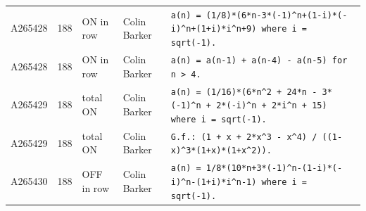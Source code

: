 \documentclass[11pt]{article}
\theoremstyle{definition}
\theoremstyle{remark}
\begin{document}
{\begin{longtable}{p{1.3cm}p{0.7cm}p{2.4cm}p{2.3cm}p{7.3cm}}
A265428 & 188 & ON in row & Colin Barker & \texttt{a(n)\allowbreak{} \allowbreak{}=\allowbreak{} \allowbreak{}(1/\allowbreak{}8)\allowbreak{}*\allowbreak{}(6*\allowbreak{}n-\allowbreak{}3*\allowbreak{}(-\allowbreak{}1)\allowbreak{}\^{}n+\allowbreak{}(1-\allowbreak{}i)\allowbreak{}*\allowbreak{}(-\allowbreak{}i)\allowbreak{}\^{}n+\allowbreak{}(1+\allowbreak{}i)\allowbreak{}*\allowbreak{}i\^{}n+\allowbreak{}9)\allowbreak{} \allowbreak{}where \allowbreak{}i \allowbreak{}=\allowbreak{} \allowbreak{}sqrt(-\allowbreak{}1)\allowbreak{}.} \\
A265428 & 188 & ON in row & Colin Barker & \texttt{a(n)\allowbreak{} \allowbreak{}=\allowbreak{} \allowbreak{}a(n-\allowbreak{}1)\allowbreak{} \allowbreak{}+\allowbreak{} \allowbreak{}a(n-\allowbreak{}4)\allowbreak{} \allowbreak{}-\allowbreak{} \allowbreak{}a(n-\allowbreak{}5)\allowbreak{} \allowbreak{}for \allowbreak{}n \allowbreak{}> \allowbreak{}4.} \\
A265429 & 188 & total ON & Colin Barker & \texttt{a(n)\allowbreak{} \allowbreak{}=\allowbreak{} \allowbreak{}(1/\allowbreak{}16)\allowbreak{}*\allowbreak{}(6*\allowbreak{}n\^{}2 \allowbreak{}+\allowbreak{} \allowbreak{}24*\allowbreak{}n \allowbreak{}-\allowbreak{} \allowbreak{}3*\allowbreak{}(-\allowbreak{}1)\allowbreak{}\^{}n \allowbreak{}+\allowbreak{} \allowbreak{}2*\allowbreak{}(-\allowbreak{}i)\allowbreak{}\^{}n \allowbreak{}+\allowbreak{} \allowbreak{}2*\allowbreak{}i\^{}n \allowbreak{}+\allowbreak{} \allowbreak{}15)\allowbreak{} \allowbreak{}where \allowbreak{}i \allowbreak{}=\allowbreak{} \allowbreak{}sqrt(-\allowbreak{}1)\allowbreak{}.} \\
A265429 & 188 & total ON & Colin Barker & \texttt{G.f.: \allowbreak{}(1 \allowbreak{}+\allowbreak{} \allowbreak{}x \allowbreak{}+\allowbreak{} \allowbreak{}2*\allowbreak{}x\^{}3 \allowbreak{}-\allowbreak{} \allowbreak{}x\^{}4)\allowbreak{} \allowbreak{}/\allowbreak{} \allowbreak{}((1-\allowbreak{}x)\allowbreak{}\^{}3*\allowbreak{}(1+\allowbreak{}x)\allowbreak{}*\allowbreak{}(1+\allowbreak{}x\^{}2)\allowbreak{})\allowbreak{}.} \\
A265430 & 188 & OFF in row & Colin Barker & \texttt{a(n)\allowbreak{} \allowbreak{}=\allowbreak{} \allowbreak{}1/\allowbreak{}8*\allowbreak{}(10*\allowbreak{}n+\allowbreak{}3*\allowbreak{}(-\allowbreak{}1)\allowbreak{}\^{}n-\allowbreak{}(1-\allowbreak{}i)\allowbreak{}*\allowbreak{}(-\allowbreak{}i)\allowbreak{}\^{}n-\allowbreak{}(1+\allowbreak{}i)\allowbreak{}*\allowbreak{}i\^{}n-\allowbreak{}1)\allowbreak{} \allowbreak{}where \allowbreak{}i \allowbreak{}=\allowbreak{} \allowbreak{}sqrt(-\allowbreak{}1)\allowbreak{}.} \\

\end{longtable}}
\end{document}

